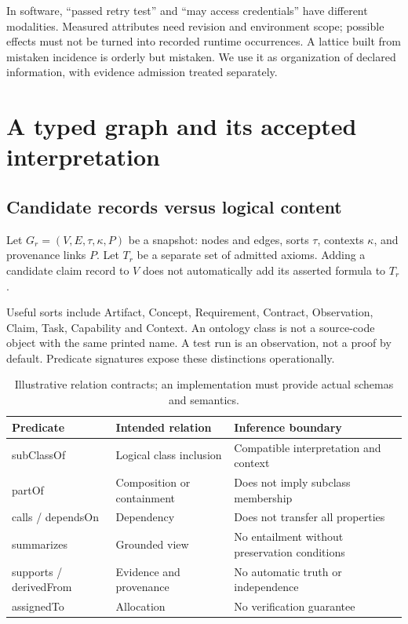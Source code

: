 \documentclass[11pt]{article}
\begin{document}
In software, ``passed retry test'' and ``may access credentials'' have different modalities. Measured attributes need revision and environment scope; possible effects must not be turned into recorded runtime occurrences. A lattice built from mistaken incidence is orderly but mistaken. We use it as organization of declared information, with evidence admission treated separately.

\section{A typed graph and its accepted interpretation}
\subsection{Candidate records versus logical content}
Let $G_r=(V,E,\tau,\kappa,P)$ be a snapshot: nodes and edges, sorts $\tau$, contexts $\kappa$, and provenance links $P$. Let $T_r$ be a separate set of admitted axioms. Adding a candidate claim record to $V$ does not automatically add its asserted formula to $T_r$.

Useful sorts include Artifact, Concept, Requirement, Contract, Observation, Claim, Task, Capability and Context. An ontology class is not a source-code object with the same printed name. A test run is an observation, not a proof by default. Predicate signatures expose these distinctions operationally.

\begin{table}[ht]\small\centering
\begin{tabularx}{\linewidth}{@{}lXX@{}}\toprule
Predicate & Intended relation & Inference boundary \\\midrule
subClassOf & Logical class inclusion & Compatible interpretation and context \\
partOf & Composition or containment & Does not imply subclass membership \\
calls / dependsOn & Dependency & Does not transfer all properties \\
summarizes & Grounded view & No entailment without preservation conditions \\
supports / derivedFrom & Evidence and provenance & No automatic truth or independence \\
assignedTo & Allocation & No verification guarantee \\\bottomrule
\end{tabularx}\caption{Illustrative relation contracts; an implementation must provide actual schemas and semantics.}\end{table}
\end{document}

